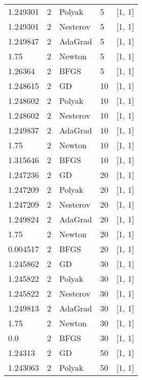 \begin{tabular}{lllll}
  1.249301 &        2 &   Polyak &      5 &           [1, 1] \\
  1.249301 &        2 & Nesterov &      5 &           [1, 1] \\
  1.249847 &        2 &  AdaGrad &      5 &           [1, 1] \\
      1.75 &        2 &   Newton &      5 &           [1, 1] \\
   1.26364 &        2 &     BFGS &      5 &           [1, 1] \\
  1.248615 &        2 &       GD &     10 &           [1, 1] \\
  1.248602 &        2 &   Polyak &     10 &           [1, 1] \\
  1.248602 &        2 & Nesterov &     10 &           [1, 1] \\
  1.249837 &        2 &  AdaGrad &     10 &           [1, 1] \\
      1.75 &        2 &   Newton &     10 &           [1, 1] \\
  1.315646 &        2 &     BFGS &     10 &           [1, 1] \\
  1.247236 &        2 &       GD &     20 &           [1, 1] \\
  1.247209 &        2 &   Polyak &     20 &           [1, 1] \\
  1.247209 &        2 & Nesterov &     20 &           [1, 1] \\
  1.249824 &        2 &  AdaGrad &     20 &           [1, 1] \\
      1.75 &        2 &   Newton &     20 &           [1, 1] \\
  0.004517 &        2 &     BFGS &     20 &           [1, 1] \\
  1.245862 &        2 &       GD &     30 &           [1, 1] \\
  1.245822 &        2 &   Polyak &     30 &           [1, 1] \\
  1.245822 &        2 & Nesterov &     30 &           [1, 1] \\
  1.249813 &        2 &  AdaGrad &     30 &           [1, 1] \\
      1.75 &        2 &   Newton &     30 &           [1, 1] \\
       0.0 &        2 &     BFGS &     30 &           [1, 1] \\
   1.24313 &        2 &       GD &     50 &           [1, 1] \\
  1.243063 &        2 &   Polyak &     50 &           [1, 1] \\

\end{tabular}
